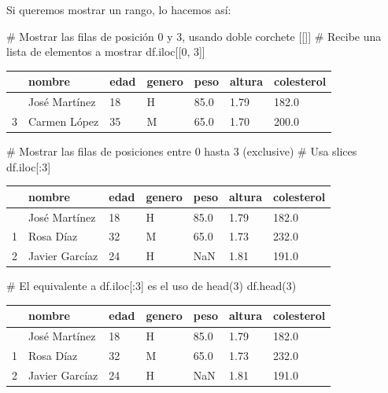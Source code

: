 \documentclass[
  letterpaper,
  DIV=11,
  numbers=noendperiod]{scrreprt}
\newenvironment{Shaded}{\begin{snugshade}}{\end{snugshade}}
\newcommand{\CommentTok}[1]{\textcolor[rgb]{0.37,0.37,0.37}{#1}}
\newcommand{\DecValTok}[1]{\textcolor[rgb]{0.68,0.00,0.00}{#1}}
\newcommand{\NormalTok}[1]{\textcolor[rgb]{0.00,0.23,0.31}{#1}}
\begin{document}
Si queremos mostrar un rango, lo hacemos así:

\begin{Shaded}
\begin{Highlighting}[]
\CommentTok{\# Mostrar las filas de posición 0 y 3, usando doble corchete [[]]}
\CommentTok{\# Recibe una lista de elementos a mostrar}
\NormalTok{df.iloc[[}\DecValTok{0}\NormalTok{, }\DecValTok{3}\NormalTok{]]}
\end{Highlighting}
\end{Shaded}

\begin{longtable}[]{@{}lllllll@{}}
\toprule\noalign{}
& nombre & edad & genero & peso & altura & colesterol \\
\midrule\noalign{}
\endhead
\bottomrule\noalign{}
\endlastfoot
0 & José Martínez & 18 & H & 85.0 & 1.79 & 182.0 \\
3 & Carmen López & 35 & M & 65.0 & 1.70 & 200.0 \\
\end{longtable}

\begin{Shaded}
\begin{Highlighting}[]
\CommentTok{\# Mostrar las filas de posiciones entre 0 hasta 3 (exclusive)}
\CommentTok{\# Usa slices}
\NormalTok{df.iloc[:}\DecValTok{3}\NormalTok{]}
\end{Highlighting}
\end{Shaded}

\begin{longtable}[]{@{}lllllll@{}}
\toprule\noalign{}
& nombre & edad & genero & peso & altura & colesterol \\
\midrule\noalign{}
\endhead
\bottomrule\noalign{}
\endlastfoot
0 & José Martínez & 18 & H & 85.0 & 1.79 & 182.0 \\
1 & Rosa Díaz & 32 & M & 65.0 & 1.73 & 232.0 \\
2 & Javier Garcíaz & 24 & H & NaN & 1.81 & 191.0 \\
\end{longtable}

\begin{Shaded}
\begin{Highlighting}[]
\CommentTok{\# El equivalente a df.iloc[:3] es el uso de head(3)}
\NormalTok{df.head(}\DecValTok{3}\NormalTok{)}
\end{Highlighting}
\end{Shaded}

\begin{longtable}[]{@{}lllllll@{}}
\toprule\noalign{}
& nombre & edad & genero & peso & altura & colesterol \\
\midrule\noalign{}
\endhead
\bottomrule\noalign{}
\endlastfoot
0 & José Martínez & 18 & H & 85.0 & 1.79 & 182.0 \\
1 & Rosa Díaz & 32 & M & 65.0 & 1.73 & 232.0 \\
2 & Javier Garcíaz & 24 & H & NaN & 1.81 & 191.0 \\
\end{longtable}
\end{document}
